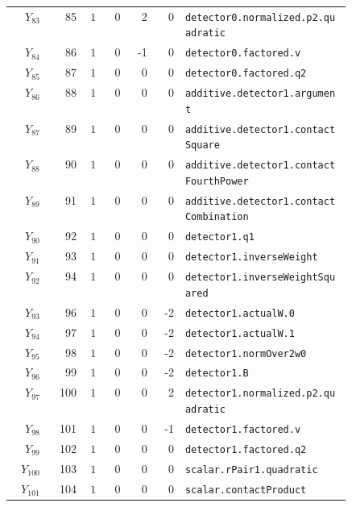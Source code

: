 {\begin{longtable}{@{}r r c r r r p{0.49\linewidth}@{}}
\(Y_{83}\) & 85 & \(1\) & 0 & 2 & 0 & \texttt{detector0.\allowbreak{}normalized.\allowbreak{}p2.\allowbreak{}quadratic} \\
\(Y_{84}\) & 86 & \(1\) & 0 & -1 & 0 & \texttt{detector0.\allowbreak{}factored.\allowbreak{}v} \\
\(Y_{85}\) & 87 & \(1\) & 0 & 0 & 0 & \texttt{detector0.\allowbreak{}factored.\allowbreak{}q2} \\
\(Y_{86}\) & 88 & \(1\) & 0 & 0 & 0 & \texttt{additive.\allowbreak{}detector1.\allowbreak{}argument} \\
\(Y_{87}\) & 89 & \(1\) & 0 & 0 & 0 & \texttt{additive.\allowbreak{}detector1.\allowbreak{}contactSquare} \\
\(Y_{88}\) & 90 & \(1\) & 0 & 0 & 0 & \texttt{additive.\allowbreak{}detector1.\allowbreak{}contactFourthPower} \\
\(Y_{89}\) & 91 & \(1\) & 0 & 0 & 0 & \texttt{additive.\allowbreak{}detector1.\allowbreak{}contactCombination} \\
\(Y_{90}\) & 92 & \(1\) & 0 & 0 & 0 & \texttt{detector1.\allowbreak{}q1} \\
\(Y_{91}\) & 93 & \(1\) & 0 & 0 & 0 & \texttt{detector1.\allowbreak{}inverseWeight} \\
\(Y_{92}\) & 94 & \(1\) & 0 & 0 & 0 & \texttt{detector1.\allowbreak{}inverseWeightSquared} \\
\(Y_{93}\) & 96 & \(1\) & 0 & 0 & -2 & \texttt{detector1.\allowbreak{}actualW.\allowbreak{}0} \\
\(Y_{94}\) & 97 & \(1\) & 0 & 0 & -2 & \texttt{detector1.\allowbreak{}actualW.\allowbreak{}1} \\
\(Y_{95}\) & 98 & \(1\) & 0 & 0 & -2 & \texttt{detector1.\allowbreak{}normOver2w0} \\
\(Y_{96}\) & 99 & \(1\) & 0 & 0 & -2 & \texttt{detector1.\allowbreak{}B} \\
\(Y_{97}\) & 100 & \(1\) & 0 & 0 & 2 & \texttt{detector1.\allowbreak{}normalized.\allowbreak{}p2.\allowbreak{}quadratic} \\
\(Y_{98}\) & 101 & \(1\) & 0 & 0 & -1 & \texttt{detector1.\allowbreak{}factored.\allowbreak{}v} \\
\(Y_{99}\) & 102 & \(1\) & 0 & 0 & 0 & \texttt{detector1.\allowbreak{}factored.\allowbreak{}q2} \\
\(Y_{100}\) & 103 & \(1\) & 0 & 0 & 0 & \texttt{scalar.\allowbreak{}rPair1.\allowbreak{}quadratic} \\
\(Y_{101}\) & 104 & \(1\) & 0 & 0 & 0 & \texttt{scalar.\allowbreak{}contactProduct} \\

\end{longtable}}
